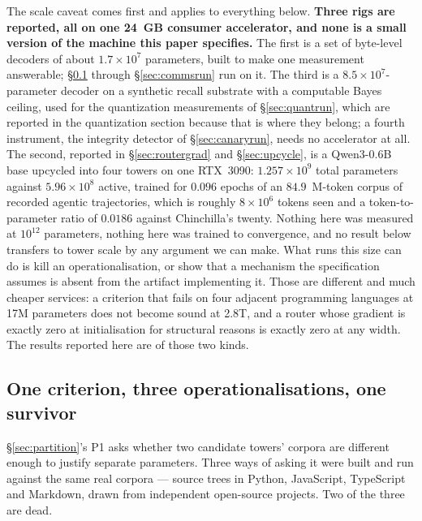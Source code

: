\documentclass[11pt]{article}
\begin{document}
The scale caveat comes first and applies to everything below. \textbf{Three rigs are reported, all on one 24~GB consumer accelerator, and none is a small version of the machine this paper specifies.} The first is a set of byte-level decoders of about $1.7\times10^{7}$ parameters, built to make one measurement answerable; \S\ref{sec:f11run} through \S\ref{sec:commsrun} run on it. The third is a $8.5\times10^{7}$-parameter decoder on a synthetic recall substrate with a computable Bayes ceiling, used for the quantization measurements of \S\ref{sec:quantrun}, which are reported in the quantization section because that is where they belong; a fourth instrument, the integrity detector of \S\ref{sec:canaryrun}, needs no accelerator at all. The second, reported in \S\ref{sec:routergrad} and \S\ref{sec:upcycle}, is a Qwen3-0.6B base upcycled into four towers on one RTX~3090: $1.257\times10^{9}$ total parameters against $5.96\times10^{8}$ active, trained for $0.096$ epochs of an $84.9$~M-token corpus of recorded agentic trajectories, which is roughly $8\times10^{6}$ tokens seen and a token-to-parameter ratio of $0.0186$ against Chinchilla's twenty. Nothing here was measured at $10^{12}$ parameters, nothing here was trained to convergence, and no result below transfers to tower scale by any argument we can make. What runs this size can do is kill an operationalisation, or show that a mechanism the specification assumes is absent from the artifact implementing it. Those are different and much cheaper services: a criterion that fails on four adjacent programming languages at 17M parameters does not become sound at 2.8T, and a router whose gradient is exactly zero at initialisation for structural reasons is exactly zero at any width. The results reported here are of those two kinds.

\subsection{One criterion, three operationalisations, one survivor}
\label{sec:f11run}

\S\ref{sec:partition}'s P1 asks whether two candidate towers' corpora are different enough to justify separate parameters. Three ways of asking it were built and run against the same real corpora --- source trees in Python, JavaScript, TypeScript and Markdown, drawn from independent open-source projects. Two of the three are dead.
\end{document}

